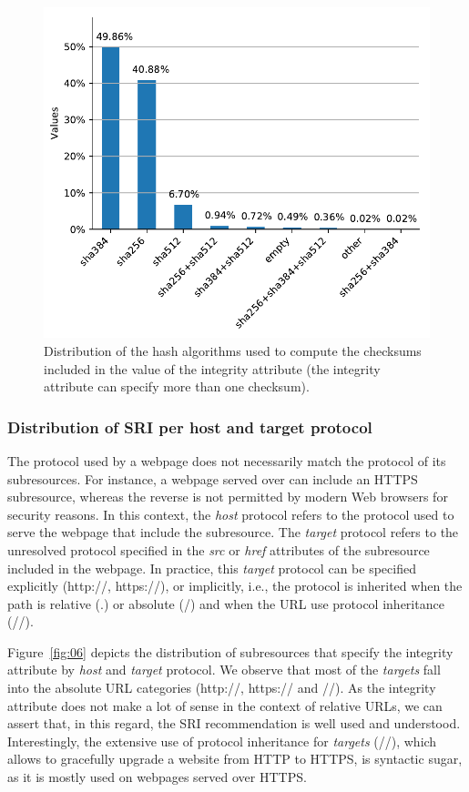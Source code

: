 \documentclass[sigconf,table]{acmart}
\begin{document}
\begin{figure}[h]
	\includegraphics[width=\columnwidth]{../../notebooks/04_sri_per_algorithm}
	\caption{Distribution of the hash algorithms used to compute the checksums included in the value of the integrity attribute (the integrity attribute can specify more than one checksum).}
	\label{fig:04}
\end{figure}

\subsubsection{Distribution of SRI per host and target protocol}

The protocol used by a webpage does not necessarily match the protocol of its subresources.
For instance, a webpage served over can include an HTTPS subresource, whereas the reverse is not permitted by modern Web browsers for security reasons.
In this context, the \textit{host} protocol refers to the protocol used to serve the webpage that include the subresource.
The \textit{target} protocol refers to the unresolved protocol specified in the \textit{src} or \textit{href} attributes of the subresource included in the webpage.
In practice, this \textit{target} protocol can be specified explicitly (http://, https://), or implicitly, i.e., the protocol is inherited when the path is relative (.) or absolute (/) and when the URL use protocol inheritance (//).


Figure~\ref{fig:06} depicts the distribution of subresources that specify the integrity attribute by \textit{host} and \textit{target} protocol.
We observe that most of the \textit{targets} fall into the absolute URL categories (http://, https:// and //).
As the integrity attribute does not make a lot of sense in the context of relative URLs, we can assert that, in this regard, the SRI recommendation is well used and understood.
Interestingly, the extensive use of protocol inheritance for \textit{targets} (//), which allows to gracefully upgrade a website from HTTP to HTTPS, is syntactic sugar, as it is mostly used on webpages served over HTTPS.
	
\end{document}
